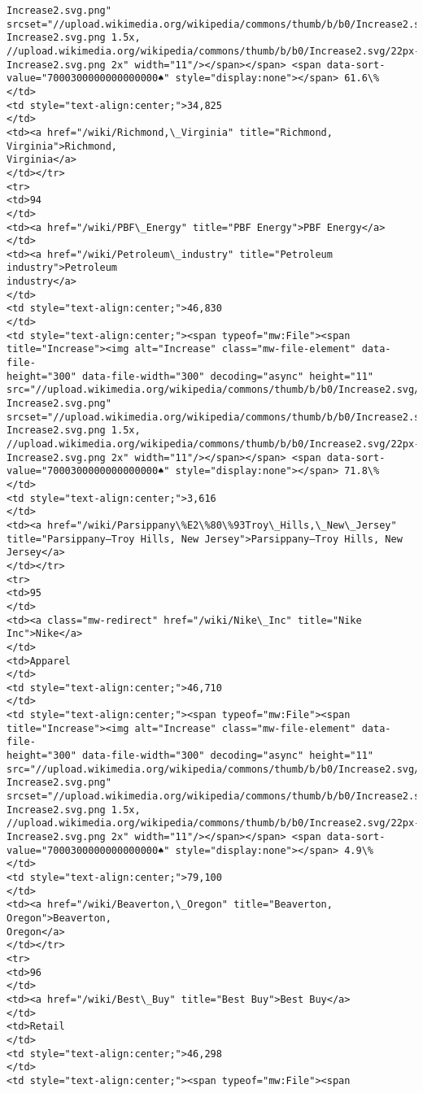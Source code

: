 \documentclass[11pt]{article}
\begin{document}
\begin{Verbatim}[commandchars=\\\{\}]
Increase2.svg.png"
srcset="//upload.wikimedia.org/wikipedia/commons/thumb/b/b0/Increase2.svg/17px-
Increase2.svg.png 1.5x,
//upload.wikimedia.org/wikipedia/commons/thumb/b/b0/Increase2.svg/22px-
Increase2.svg.png 2x" width="11"/></span></span> <span data-sort-
value="7000300000000000000♠" style="display:none"></span> 61.6\%
</td>
<td style="text-align:center;">34,825
</td>
<td><a href="/wiki/Richmond,\_Virginia" title="Richmond, Virginia">Richmond,
Virginia</a>
</td></tr>
<tr>
<td>94
</td>
<td><a href="/wiki/PBF\_Energy" title="PBF Energy">PBF Energy</a>
</td>
<td><a href="/wiki/Petroleum\_industry" title="Petroleum industry">Petroleum
industry</a>
</td>
<td style="text-align:center;">46,830
</td>
<td style="text-align:center;"><span typeof="mw:File"><span
title="Increase"><img alt="Increase" class="mw-file-element" data-file-
height="300" data-file-width="300" decoding="async" height="11"
src="//upload.wikimedia.org/wikipedia/commons/thumb/b/b0/Increase2.svg/11px-
Increase2.svg.png"
srcset="//upload.wikimedia.org/wikipedia/commons/thumb/b/b0/Increase2.svg/17px-
Increase2.svg.png 1.5x,
//upload.wikimedia.org/wikipedia/commons/thumb/b/b0/Increase2.svg/22px-
Increase2.svg.png 2x" width="11"/></span></span> <span data-sort-
value="7000300000000000000♠" style="display:none"></span> 71.8\%
</td>
<td style="text-align:center;">3,616
</td>
<td><a href="/wiki/Parsippany\%E2\%80\%93Troy\_Hills,\_New\_Jersey"
title="Parsippany–Troy Hills, New Jersey">Parsippany–Troy Hills, New Jersey</a>
</td></tr>
<tr>
<td>95
</td>
<td><a class="mw-redirect" href="/wiki/Nike\_Inc" title="Nike Inc">Nike</a>
</td>
<td>Apparel
</td>
<td style="text-align:center;">46,710
</td>
<td style="text-align:center;"><span typeof="mw:File"><span
title="Increase"><img alt="Increase" class="mw-file-element" data-file-
height="300" data-file-width="300" decoding="async" height="11"
src="//upload.wikimedia.org/wikipedia/commons/thumb/b/b0/Increase2.svg/11px-
Increase2.svg.png"
srcset="//upload.wikimedia.org/wikipedia/commons/thumb/b/b0/Increase2.svg/17px-
Increase2.svg.png 1.5x,
//upload.wikimedia.org/wikipedia/commons/thumb/b/b0/Increase2.svg/22px-
Increase2.svg.png 2x" width="11"/></span></span> <span data-sort-
value="7000300000000000000♠" style="display:none"></span> 4.9\%
</td>
<td style="text-align:center;">79,100
</td>
<td><a href="/wiki/Beaverton,\_Oregon" title="Beaverton, Oregon">Beaverton,
Oregon</a>
</td></tr>
<tr>
<td>96
</td>
<td><a href="/wiki/Best\_Buy" title="Best Buy">Best Buy</a>
</td>
<td>Retail
</td>
<td style="text-align:center;">46,298
</td>
<td style="text-align:center;"><span typeof="mw:File"><span

\end{Verbatim}
\end{document}
